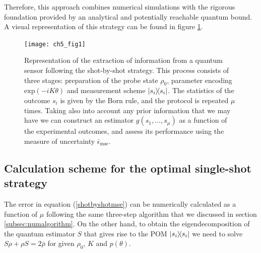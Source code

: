 Therefore, this approach combines numerical simulations with the rigorous foundation provided by an analytical and potentially reachable quantum bound. A visual representation of this strategy can be found in figure \ref{singleshotvisual}. 

\begin{figure}
\centering
\texttt{[image: ch5\_fig1]}
	\caption[Extraction of information from a quantum sensor]{Representation of the extraction of information from a quantum sensor following the shot-by-shot strategy. This process consists of three stages: preparation of the probe state $\rho_0$, parameter encoding $\mathrm{exp}(-i K\theta)$ and measurement scheme $\ketbra{s_i}$. The statistics of the outcome $s_i$ is given by the Born rule, and the protocol is repeated $\mu$ times. Taking also into account any prior information that we may have we can construct an estimator $g(s_1,\dots,s_\mu)$ as a function of the experimental outcomes, and assess its performance using the measure of uncertainty $\bar{\epsilon}_\mathrm{mse}$.}
\label{singleshotvisual}
\end{figure}

\subsection{Calculation scheme for the optimal single-shot strategy}
\label{numcal}

The error in equation (\ref{shotbyshotmse}) can be numerically calculated as a function of $\mu$ following the same three-step algorithm that we discussed in section \ref{subsec:numalgorithm}. On the other hand, to obtain the eigendecomposition of the quantum estimator $S$ that gives rise to the POM $\ketbra{s_i}$ we need to solve $S \rho + \rho S = 2 \bar{\rho}$ for given $\rho_0$, $K$ and $p(\theta)$. 

